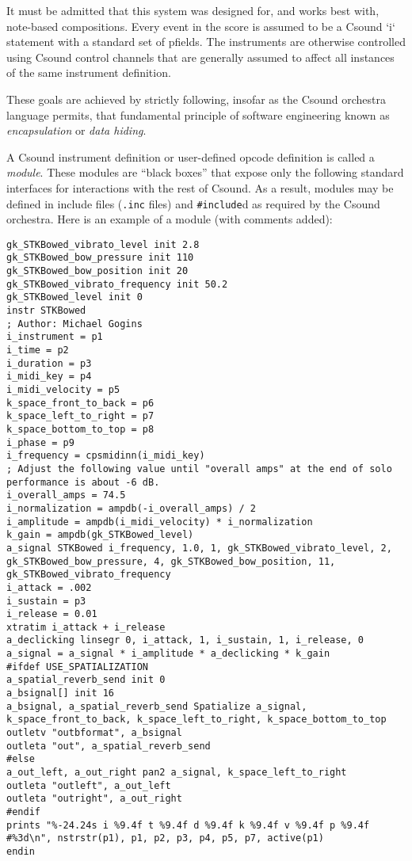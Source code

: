 \documentclass[12pt,letterpaper,onecolumn]{scrartcl}
\begin{document}
It must be admitted that this system was designed for, and works best with,
note-based compositions. Every event in the score is assumed to be a Csound
`i` statement with a standard set of pfields. The instruments are otherwise
controlled using Csound control channels that are generally assumed to affect
all instances of the same instrument definition.

These goals are achieved by strictly following, insofar as the
Csound orchestra language permits, that fundamental principle of software
engineering known as \emph{encapsulation} or \emph{data hiding}.

A Csound instrument definition or user-defined opcode definition is called a
\emph{module}. These modules are ``black boxes'' that expose only the following
standard interfaces for interactions with the rest of Csound. As a result,
modules may be defined in include files (\texttt{.inc} files) and
\texttt{\#include}d as required by the Csound orchestra. Here is an example of
a module (with comments added):

\begin{lstlisting}
gk_STKBowed_vibrato_level init 2.8
gk_STKBowed_bow_pressure init 110
gk_STKBowed_bow_position init 20
gk_STKBowed_vibrato_frequency init 50.2
gk_STKBowed_level init 0
instr STKBowed
; Author: Michael Gogins
i_instrument = p1
i_time = p2
i_duration = p3
i_midi_key = p4
i_midi_velocity = p5
k_space_front_to_back = p6
k_space_left_to_right = p7
k_space_bottom_to_top = p8
i_phase = p9
i_frequency = cpsmidinn(i_midi_key)
; Adjust the following value until "overall amps" at the end of solo performance is about -6 dB.
i_overall_amps = 74.5
i_normalization = ampdb(-i_overall_amps) / 2
i_amplitude = ampdb(i_midi_velocity) * i_normalization
k_gain = ampdb(gk_STKBowed_level)
a_signal STKBowed i_frequency, 1.0, 1, gk_STKBowed_vibrato_level, 2, gk_STKBowed_bow_pressure, 4, gk_STKBowed_bow_position, 11, gk_STKBowed_vibrato_frequency
i_attack = .002
i_sustain = p3
i_release = 0.01
xtratim i_attack + i_release
a_declicking linsegr 0, i_attack, 1, i_sustain, 1, i_release, 0
a_signal = a_signal * i_amplitude * a_declicking * k_gain
#ifdef USE_SPATIALIZATION
a_spatial_reverb_send init 0
a_bsignal[] init 16
a_bsignal, a_spatial_reverb_send Spatialize a_signal, k_space_front_to_back, k_space_left_to_right, k_space_bottom_to_top
outletv "outbformat", a_bsignal
outleta "out", a_spatial_reverb_send
#else
a_out_left, a_out_right pan2 a_signal, k_space_left_to_right
outleta "outleft", a_out_left
outleta "outright", a_out_right
#endif
prints "%-24.24s i %9.4f t %9.4f d %9.4f k %9.4f v %9.4f p %9.4f #%3d\n", nstrstr(p1), p1, p2, p3, p4, p5, p7, active(p1)
endin
\end{lstlisting}
\end{document}
